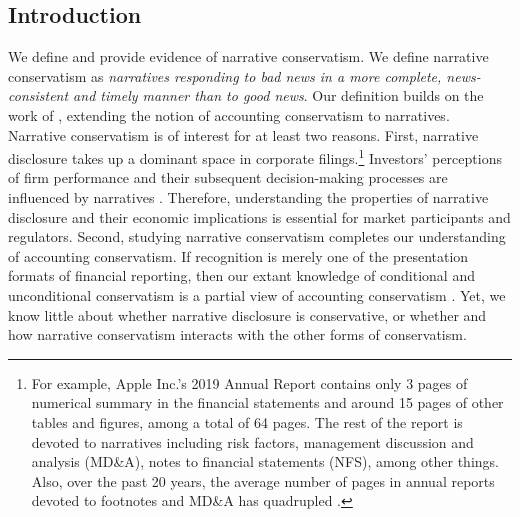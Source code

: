 \documentclass[letterpaper,11pt]{article}
\begin{document}
\begin{spacing}{1.5}
\section{Introduction}
\noindent We define and provide evidence of narrative conservatism. We define narrative conservatism as \textit{narratives responding to bad news in a more complete, news-consistent and timely manner than to good news}. Our definition builds on the work of , extending the notion of accounting conservatism to narratives. Narrative conservatism is of interest for at least two reasons. First, narrative disclosure takes up a dominant space in corporate filings.\footnote{For example, Apple Inc.'s 2019 Annual Report contains only 3 pages of numerical summary in the financial statements and around 15 pages of other tables and figures, among a total of 64 pages. The rest of the report is devoted to narratives including risk factors, management discussion and analysis (MD\&A), notes to financial statements (NFS), among other things. Also, over the past 20 years, the average number of pages in annual reports devoted to footnotes and MD\&A has quadrupled \cite{eyPointNowTime2012}.} Investors' perceptions of firm performance and their subsequent decision-making processes are influenced by narratives \cite{liTextualAnalysisCorporate2011}. Therefore, understanding the properties of narrative disclosure and their economic implications is essential for market participants and regulators. Second, studying narrative conservatism completes our understanding of accounting conservatism. If recognition is merely one of the presentation formats of financial reporting, then our extant knowledge of conditional and unconditional conservatism is a partial view of accounting conservatism \cite{kothariManagersWithholdBad2009, guayConservativeDisclosure2018}. Yet, we know little about whether narrative disclosure is conservative, or whether and how narrative conservatism interacts with the other forms of conservatism.


\end{spacing}
\end{document}
